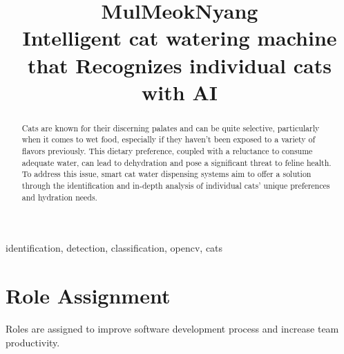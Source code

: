 \documentclass[conference]{IEEEtran}
\begin{document}
\title{MulMeokNyang\\
{\footnotesize \textsuperscript{}Intelligent cat watering machine that Recognizes individual cats with AI}
}

\author{
\and
{}
\and
{}
\and
{}
}

\maketitle

\begin{abstract}
Cats are known for their discerning palates and can be quite selective, particularly when it comes to wet food, especially if they haven't been exposed to a variety of flavors previously. This dietary preference, coupled with a reluctance to consume adequate water, can lead to dehydration and pose a significant threat to feline health. To address this issue, smart cat water dispensing systems aim to offer a solution through the identification and in-depth analysis of individual cats' unique preferences and hydration needs.
\end{abstract}

\begin{IEEEkeywords}
identification, detection, classification, opencv, cats
\end{IEEEkeywords}

\section{Role Assignment}
Roles are assigned to improve software development process and increase team productivity.
\newline
\end{document}
